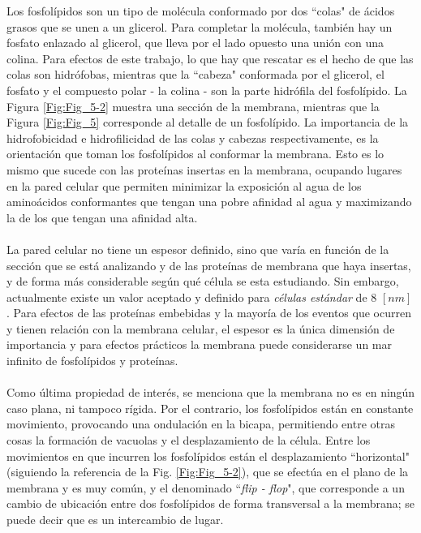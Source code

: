 \documentclass[12pt, oneside, numbers, spanish]{ezthesis}
\numberwithin{equation}{section}
\begin{document}
\noindent
Los fosfolípidos son un tipo de molécula conformado por dos ``colas" de ácidos grasos que se unen a un glicerol. Para completar la molécula, también hay un fosfato enlazado al glicerol, que lleva por el lado opuesto una unión con una colina. Para efectos de este trabajo, lo que hay que rescatar es el hecho de que las colas son hidrófobas, mientras que la ``cabeza" conformada por el glicerol, el fosfato y el compuesto polar - la colina - son la parte hidrófila del fosfolípido. La Figura \ref{Fig:Fig_5-2} muestra una sección de la membrana, mientras que la Figura \ref{Fig:Fig_5} corresponde al detalle de un fosfolípido.
%	
La importancia de la hidrofobicidad e hidrofilicidad de las colas y cabezas respectivamente, es la orientación que toman los fosfolípidos al conformar la membrana. Esto es lo mismo que sucede con las proteínas insertas en la membrana, ocupando lugares en la pared celular que permiten minimizar la exposición al agua de los aminoácidos conformantes que tengan una pobre afinidad al agua y maximizando la de los que tengan una afinidad alta.\\\\
La pared celular no tiene un espesor definido, sino que varía en función de la sección que se está analizando y de las proteínas de membrana que haya insertas, y de forma más considerable según qué célula se esta estudiando. Sin embargo, actualmente existe un valor aceptado y definido para \textit{células estándar} de 8 $[nm]$ \cite{Lombard}. Para efectos de las proteínas embebidas y la mayoría de los eventos que ocurren y tienen relación con la membrana celular, el espesor es la única dimensión de importancia y para efectos prácticos la membrana puede considerarse un mar infinito de fosfolípidos y proteínas.\\\\
Como última propiedad de interés, se menciona que la membrana no es en ningún caso plana, ni tampoco rígida. Por el contrario, los fosfolípidos están en constante movimiento, provocando una ondulación en la bicapa, permitiendo entre otras cosas la formación de vacuolas y el desplazamiento de la célula. Entre los movimientos en que incurren los fosfolípidos están el desplazamiento ``horizontal" (siguiendo la referencia de la Fig. \ref{Fig:Fig_5-2}), que se efectúa en el plano de la membrana y es muy común, y el denominado ``\textit{flip - flop}", que corresponde a un cambio de ubicación entre dos fosfolípidos de forma transversal a la membrana; se puede decir que es un intercambio de lugar.\\\\
\end{document}

